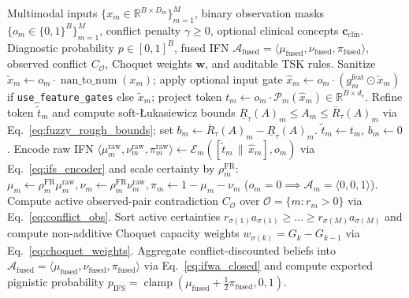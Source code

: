 \documentclass[10pt,twocolumn]{article}
\begin{document}
\begin{algorithm}[t]
\caption{\texttt{UnifiedDeepFuzzyModel} Forward Inference and Audit Pipeline}
\label{alg:deepfuzzy}
\scriptsize
\begin{algorithmic}[1]
\Require Multimodal inputs $\{x_m \in \mathbb{R}^{B \times D_m}\}_{m=1}^M$, binary observation
masks $\{o_m \in \{0,1\}^B\}_{m=1}^M$, conflict penalty $\gamma \ge 0$, optional clinical
concepts $\bm{c}_{\text{clin}}$.
\Ensure Diagnostic probability $p \in [0,1]^B$, fused IFN $\mathcal{A}_{\text{fused}} = \langle
\mu_{\text{fused}}, \nu_{\text{fused}}, \pi_{\text{fused}}\rangle$, observed conflict
$C_{\mathcal{O}}$, Choquet weights $\bm{w}$, and auditable TSK rules.
    \State Sanitize $\tilde{x}_m \gets o_m \cdot \operatorname{nan\_to\_num}(x_m)$; apply
    optional input gate $\hat{x}_m \gets o_m \cdot (g_m^{\text{feat}} \odot \tilde{x}_m)$ if
    \texttt{use\_feature\_gates} else $\tilde{x}_m$; project token $t_m \gets o_m \cdot
    \mathcal{P}_m(\hat{x}_m) \in \mathbb{R}^{B \times d_e}$.
        \State Refine token $\tilde{t}_m$ and compute soft-{\L}ukasiewicz bounds
$\underline{R}_\tau(A)_m \le A_m \le \overline{R}_\tau(A)_m$ via
Eq.~\eqref{eq:fuzzy_rough_bounds}; set $b_m \gets \overline{R}_\tau(A)_m -
\underline{R}_\tau(A)_m$.
    \Else
        \State $\tilde{t}_m \gets t_m$, $b_m \gets 0$.
    \EndIf
    \State Encode raw IFN $\langle \mu_m^{\text{raw}}, \nu_m^{\text{raw}},
    \pi_m^{\text{raw}}\rangle \gets \mathcal{E}_m([\tilde{t}_m \,\|\, \hat{x}_m], o_m)$ via
    Eq.~\eqref{eq:ifs_encoder} and scale certainty by $\rho_m^{\text{FR}}$: $\mu_m \gets
    \rho_m^{\text{FR}}\mu_m^{\text{raw}}, \nu_m \gets \rho_m^{\text{FR}}\nu_m^{\text{raw}},
    \pi_m \gets 1 - \mu_m - \nu_m$ ($o_m=0 \implies \mathcal{A}_m = \langle 0,0,1\rangle$).
\EndFor
\State Compute active observed-pair contradiction $C_{\mathcal{O}}$ over $\mathcal{O} = \{m :
r_m > 0\}$ via Eq.~\eqref{eq:conflict_obs}.
\State Sort active certainties $r_{\sigma(1)}a_{\sigma(1)} \ge \dots \ge
r_{\sigma(M)}a_{\sigma(M)}$ and compute non-additive Choquet capacity weights $w_{\sigma(k)} =
G_k - G_{k-1}$ via Eq.~\eqref{eq:choquet_weights}.
\State Aggregate conflict-discounted beliefs into $\mathcal{A}_{\text{fused}} = \langle
\mu_{\text{fused}}, \nu_{\text{fused}}, \pi_{\text{fused}}\rangle$ via
Eq.~\eqref{eq:ifwa_closed} and compute exported pignistic probability $p_{\text{IFS}} =
\operatorname{clamp}(\mu_{\text{fused}} + \frac{1}{2}\pi_{\text{fused}}, 0, 1)$.

\end{algorithmic}
\end{algorithm}
\end{document}
